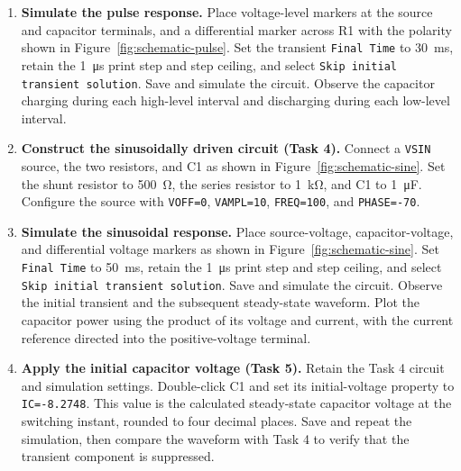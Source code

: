 \documentclass[12pt,a4paper]{article}
\begin{document}
\begin{enumerate}[label=\arabic*., leftmargin=2.5em, itemsep=6pt]
		\item \textbf{Simulate the pulse response.}
		Place voltage-level markers at the source and capacitor
		terminals, and a differential marker across R1 with the
		polarity shown in Figure~\ref{fig:schematic-pulse}.
		Set the transient \texttt{Final Time} to
		\SI{30}{\milli\second}, retain the \SI{1}{\micro\second}
		print step and step ceiling, and select
		\texttt{Skip initial transient solution}.  Save and simulate
		the circuit.  Observe the capacitor charging during each
		high-level interval and discharging during each low-level
		interval.
		
		\item \textbf{Construct the sinusoidally driven circuit (Task 4).}
		Connect a \texttt{VSIN} source, the two resistors, and C1 as
		shown in Figure~\ref{fig:schematic-sine}.  Set the shunt
		resistor to \SI{500}{\ohm}, the series resistor to
		\SI{1}{\kilo\ohm}, and C1 to \SI{1}{\micro\farad}.
		Configure the source with \texttt{VOFF=0},
		\texttt{VAMPL=10}, \texttt{FREQ=100}, and
		\texttt{PHASE=-70}.
		
		\item \textbf{Simulate the sinusoidal response.}
		Place source-voltage, capacitor-voltage, and differential
		voltage markers as shown in Figure~\ref{fig:schematic-sine}.
		Set \texttt{Final Time} to \SI{50}{\milli\second}, retain
		the \SI{1}{\micro\second} print step and step ceiling, and
		select \texttt{Skip initial transient solution}.
		Save and simulate the circuit.  Observe the initial transient
		and the subsequent steady-state waveform.  Plot the capacitor
		power using the product of its voltage and current, with the
		current reference directed into the positive-voltage terminal.
		
		\item \textbf{Apply the initial capacitor voltage (Task 5).}
		Retain the Task 4 circuit and simulation settings.
		Double-click C1 and set its initial-voltage property to
		\texttt{IC=-8.2748}.  This value is the calculated
		steady-state capacitor voltage at the switching instant,
		rounded to four decimal places.  Save and repeat the
		simulation, then compare the waveform with Task 4 to verify
		that the transient component is suppressed.
		

\end{enumerate}
\end{document}
